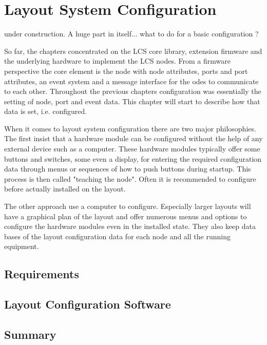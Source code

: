 \chapter{Layout System Configuration}

under construction. A huge part in itself... what to do for a basic configuration ?

So far, the chapters concentrated on the LCS core library, extension firmware and the underlying hardware to implement the LCS nodes. From a firmware perspective the core element is the node with node attributes, ports and port attributes, an event system and a message interface for the odes to communicate to each other. Throughout the previous chapters configuration was essentially the setting of node, port and event data. This chapter will start to describe how that data is set, i.e. configured.

When it comes to layout system configuration there are two major philosophies. The first insist that a hardware module can be configured without the help of any external device such as a computer. These hardware modules typically offer some buttons and switches, some even a display, for entering the required configuration data through menus or sequences of how to push buttons during startup. This process is then called "teaching the node". Often it is recommended to configure before actually installed on the layout.

The other approach use a computer to configure. Especially larger layouts will have a graphical plan of the layout and offer numerous menus and options to configure the hardware modules even in the installed state. They also keep data bases of the layout configuration data for each node and all the running equipment.

\section{Requirements}

\section{Layout Configuration Software}

\section{Summary}
